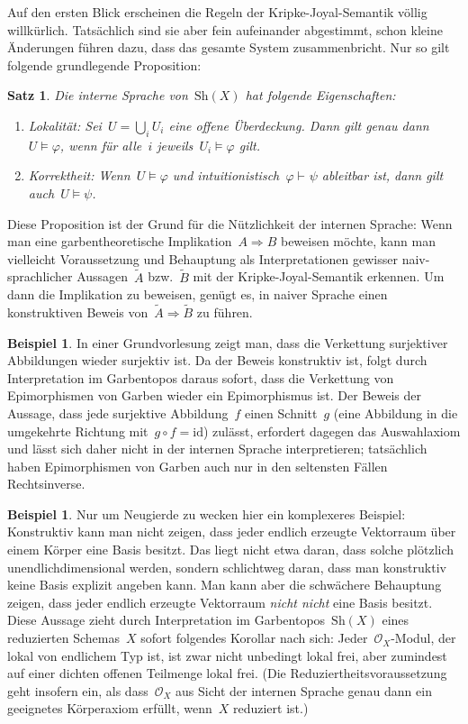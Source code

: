 \documentclass[a4paper,ngerman,12pt]{scrartcl}
\theoremstyle{definition}
\newtheorem{bsp}[defn]{Beispiel}
\theoremstyle{plain}
\newtheorem{satz}[defn]{Satz}
\theoremstyle{remark}
\renewcommand{\O}{\mathcal{O}}
\newcommand{\Sh}{\mathrm{Sh}}
\newcommand{\id}{\mathrm{id}}
\newcommand{\seq}[1]{\mathrel{\vdash\!\!\!_{#1}}}
\renewcommand{\_}{\mathpunct{.}\,}
\newcommand{\?}{\,{:}\,}
\begin{document}
Auf den ersten Blick erscheinen die Regeln der Kripke-Joyal-Semantik völlig
willkürlich. Tatsächlich sind sie aber fein aufeinander abgestimmt, schon
kleine Änderungen führen dazu, dass das gesamte System zusammenbricht. Nur so
gilt folgende grundlegende Proposition:

\begin{satz}\label{soundness}%
Die interne Sprache von~$\Sh(X)$ hat folgende Eigenschaften:
\begin{enumerate}
\item \emph{Lokalität:} Sei~$U = \bigcup_i U_i$ eine offene Überdeckung. Dann
gilt genau dann~$U \models \varphi$, wenn für alle~$i$ jeweils~$U_i \models
\varphi$ gilt.
\item \emph{Korrektheit:} Wenn~$U \models \varphi$ und
intuitionistisch~$\varphi \seq{} \psi$ ableitbar ist, dann gilt auch~$U \models
\psi$.
\end{enumerate}
\end{satz}

Diese Proposition ist der Grund für die Nützlichkeit der internen Sprache: Wenn
man eine garbentheoretische Implikation~$A \Rightarrow B$ beweisen möchte, kann man vielleicht
Voraussetzung und Behauptung als Interpretationen gewisser naiv-sprachlicher
Aussagen~$\tilde A$ bzw.~$\tilde B$ mit der Kripke-Joyal-Semantik erkennen. Um
dann die Implikation zu beweisen, genügt es, in naiver Sprache einen
konstruktiven Beweis von~$\tilde A \Rightarrow \tilde B$ zu führen.

\begin{bsp}In einer Grundvorlesung zeigt man, dass die Verkettung surjektiver
Abbildungen wieder surjektiv ist. Da der Beweis konstruktiv ist, folgt durch
Interpretation im Garbentopos daraus sofort, dass die Verkettung von
Epimorphismen von Garben wieder ein Epimorphismus ist. Der Beweis der Aussage, dass jede
surjektive Abbildung~$f$ einen Schnitt~$g$ (eine Abbildung in die umgekehrte
Richtung mit~$g \circ f = \id$) zulässt, erfordert dagegen das Auswahlaxiom und
lässt sich daher nicht in der internen Sprache interpretieren; tatsächlich
haben Epimorphismen von Garben auch nur in den seltensten Fällen Rechtsinverse.\end{bsp}

\begin{bsp}Nur um Neugierde zu wecken hier ein komplexeres Beispiel:
Konstruktiv kann man nicht zeigen, dass jeder endlich erzeugte Vektorraum über
einem Körper eine Basis besitzt. Das liegt nicht etwa daran, dass solche
plötzlich unendlichdimensional werden, sondern schlichtweg daran, dass man
konstruktiv keine Basis explizit angeben kann. Man kann aber die schwächere
Behauptung zeigen, dass jeder endlich erzeugte Vektorraum \emph{nicht nicht}
eine Basis besitzt. Diese Aussage zieht durch Interpretation im
Garbentopos~$\Sh(X)$ eines reduzierten Schemas~$X$ sofort folgendes Korollar
nach sich: Jeder~$\O_X$-Modul, der lokal von endlichem Typ ist, ist zwar nicht
unbedingt lokal frei, aber zumindest auf einer dichten offenen Teilmenge lokal
frei. (Die Reduziertheitsvoraussetzung geht insofern ein, als dass~$\O_X$ aus
Sicht der internen Sprache genau dann ein geeignetes Körperaxiom erfüllt,
wenn~$X$ reduziert ist.)\end{bsp}
\end{document}
